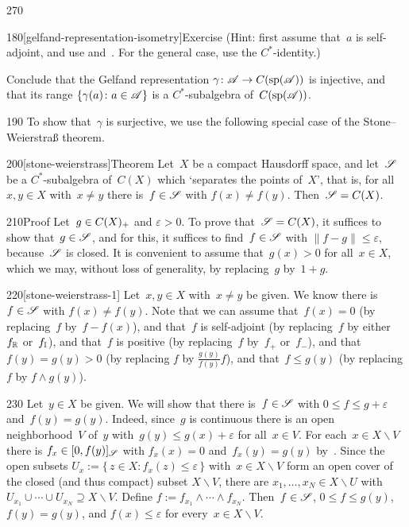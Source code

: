 \begin{parsec}{270}
\begin{point}{180}[gelfand-representation-isometry]{Exercise}
(Hint: first assume that~$a$ is self-adjoint,
and use  and~.
For the general case,
use the $C^*$-identity.)

Conclude that the Gelfand representation $\gamma\colon \mathscr{A}\to C(\mathrm{sp}(\mathscr{A}))$
is injective,
and that its range $\{\gamma(a)\colon a\in\mathscr{A}\}$
is a $C^*$-subalgebra of~$C(\mathrm{sp}(\mathscr{A}))$.
\end{point}
\begin{point}{190}%
To show that~$\gamma$ is surjective,
we use the following special case of
the Stone--Weierstra\ss{} theorem.%
\end{point}
\begin{point}{200}[stone-weierstrass]{Theorem}%
Let~$X$ be a compact Hausdorff space,
and let~$\mathscr{S}$ be a $C^*$-subalgebra of~$C(X)$
which `separates the points of~$X$',
that is, for all~$x,y\in X$ with~$x\neq y$
there is~$f\in \mathscr{S}$ with $f(x)\neq f(y)$.
Then~$\mathscr{S}=C(X)$.
\begin{point}{210}{Proof}%
Let~$g\in C(X)_{+}$ and $\varepsilon >0$.
To prove that~$\mathscr{S}=C(X)$,
it suffices to show that~$g\in \mathscr{S}$,
and for this,
it suffices to find~$f\in \mathscr{S}$ with $\|f-g\|\leq \varepsilon$,
because~$\mathscr{S}$ is closed.
It is convenient to assume that~$g(x)> 0$ for all~$x\in X$,
which we may, without loss of generality,
by replacing~$g$ by~$1+g$.
\begin{point}{220}[stone-weierstrass-1]%
Let~$x,y\in X$ with~$x\neq y$
be given.
We know there is~$f\in \mathscr{S}$ with $f(x)\neq f(y)$.
Note that we can assume that~$f(x)=0$ (by replacing~$f$ by~$f-f(x)$),
and that~$f$ is self-adjoint (by replacing~$f$
by either~$f_{\mathbb{R}}$ or~$f_{\mathbb{I}}$),
and that~$f$ is positive
(by replacing~$f$ by~$f_+$ or~$f_-$),
and that~$f(y)=g(y)>0$
(by replacing $f$ by $\frac{g(y)}{f(y)} f$),
and that~$f\leq g(y)$
(by replacing $f$ by $f\wedge g(y)$).
\end{point}
\begin{point}{230}%
Let~$y\in X$ be given.
We will show that there is~$f\in\mathscr{S}$
with $0\leq f\leq g+\varepsilon$
and~$f(y)=g(y)$.
Indeed,
since~$g$ is continuous
there is an open neighborhood~$V$ of~$y$
with~$g(y) \leq  g(x)+\varepsilon$
for all~$x\in V$.
For each~$x\in X\backslash V$ there is $f_x \in [0,f(y)]_{\mathscr{S}}$
with $f_x(x)=0$ and~$f_x(y)=g(y)$ by~.
Since the open subsets
$U_x := \{\,z\in X\colon f_x(z)\leq \varepsilon\,\}$
with~$x\in X\backslash V$
form an open cover of the closed (and thus compact) subset $X\backslash V$,
there are $x_1,\dotsc,x_N\in X\backslash U$
with $U_{x_1}\cup\dotsb\cup U_{x_N}\supseteq X\backslash V$.
Define $f:=f_{x_1}\wedge \dotsb \wedge f_{x_N}$.
Then~$f\in \mathscr{S}$, $0\leq f\leq g(y)$, $f(y)=g(y)$,
and $f(x)\leq \varepsilon$
for every~$x\in X\backslash V$.


\end{point}
\end{point}
\end{point}
\end{parsec}
